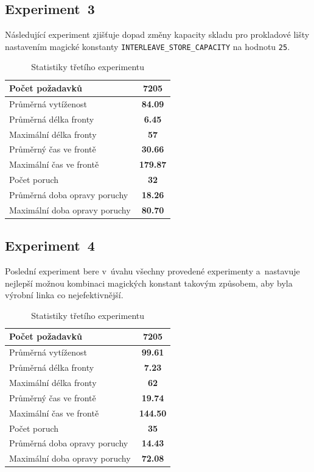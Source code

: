 \documentclass[a4paper, 11pt]{article}
\begin{document}
\newpage

\subsection{Experiment~3}
    Následující experiment zjišťuje dopad změny kapacity skladu pro prokladové lišty nastavením magické konstanty \texttt{INTERLEAVE\_STORE\_CAPACITY} na hodnotu \texttt{25}.

    \begin{table}[ht!]
        \centering
        \begin{tabular}{|l|c|}
            \hline
            Počet požadavků & \textbf{7205} \\ \hline
            Průměrná vytíženost & \textbf{84.09} \\ \hline
            Průměrná délka fronty & \textbf{6.45} \\ \hline
            Maximální délka fronty & \textbf{57} \\ \hline
            Průměrný čas ve frontě & \textbf{30.66} \\ \hline
            Maximální čas ve frontě & \textbf{179.87} \\ \hline
            Počet poruch & \textbf{32} \\ \hline
            Průměrná doba opravy poruchy & \textbf{18.26} \\ \hline
            Maximální doba opravy poruchy & \textbf{80.70} \\ \hline
        \end{tabular}
        \caption{Statistiky třetího experimentu}
    \end{table}

\subsection{Experiment~4}
    Poslední experiment bere v~úvahu všechny provedené experimenty a~nastavuje nejlepší možnou kombinaci magických konstant takovým způsobem, aby byla výrobní linka co nejefektivnější.

    \begin{table}[ht!]
        \centering
        \begin{tabular}{|l|c|}
            \hline
            Počet požadavků & \textbf{7205} \\ \hline
            Průměrná vytíženost & \textbf{99.61} \\ \hline
            Průměrná délka fronty & \textbf{7.23} \\ \hline
            Maximální délka fronty & \textbf{62} \\ \hline
            Průměrný čas ve frontě & \textbf{19.74} \\ \hline
            Maximální čas ve frontě & \textbf{144.50} \\ \hline
            Počet poruch & \textbf{35} \\ \hline
            Průměrná doba opravy poruchy & \textbf{14.43} \\ \hline
            Maximální doba opravy poruchy & \textbf{72.08} \\ \hline
        \end{tabular}
        \caption{Statistiky třetího experimentu}
    \end{table}
\end{document}
